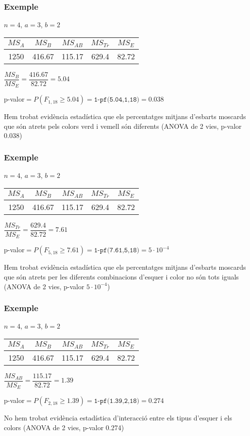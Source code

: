 \documentclass[12pt,t]{beamer}
\renewcommand{\geq}{\geqslant}
\theoremstyle{plain}
\theoremstyle{definition}
\begin{document}
\begin{frame}
\frametitle{Exemple}

$n=4$, $a=3$, $b=2$
\medskip

\begin{center}
\begin{tabular}{ccccc}
$MS_A$ & $MS_B$ & $MS_{AB}$ & $MS_{Tr}$ & $MS_E$\\ \hline
1250 &  416.67 &  115.17 & 629.4 &   82.72
\end{tabular}
\end{center}

$\dfrac{MS_{B}}{MS_E}=\dfrac{416.67}{82.72}=5.04$\medskip 

p-valor$=P(F_{1,18}\geq 5.04)=\texttt{1-pf(5.04,1,18)}=0.038$
\bigskip

Hem trobat evidència estadística que els percentatges mitjans d'esbarts moscards que són atrets pels  colors verd i vemell són diferents (ANOVA de 2 vies, p-valor 0.038)

\end{frame}

\begin{frame}\frametitle{Exemple}

$n=4$, $a=3$, $b=2$
\medskip

\begin{center}
\begin{tabular}{ccccc}
$MS_A$ & $MS_B$ & $MS_{AB}$ & $MS_{Tr}$ & $MS_E$\\ \hline
1250 &  416.67 &  115.17 & 629.4 &   82.72
\end{tabular}
\end{center}

$\dfrac{MS_{Tr}}{MS_E}=\dfrac{629.4}{82.72}=7.61$\medskip 

p-valor$=P(F_{5,18}\geq 7.61)=\texttt{1-pf(7.61,5,18)}=5\cdot 10^{-4}$
\bigskip

Hem trobat evidència estadística que els percentatges mitjans d'esbarts moscards que són atrets per les diferents combinacions d'esquer i color no són tots iguals (ANOVA de 2 vies, p-valor $5\cdot 10^{-4}$)

\end{frame}

\begin{frame}\frametitle{Exemple}

$n=4$, $a=3$, $b=2$
\medskip

\begin{center}
\begin{tabular}{ccccc}
$MS_A$ & $MS_B$ & $MS_{AB}$ & $MS_{Tr}$ & $MS_E$\\ \hline
1250 &  416.67 &  115.17 & 629.4 &   82.72
\end{tabular}
\end{center}

$\dfrac{MS_{AB}}{MS_E}=\dfrac{115.17}{82.72}=1.39$\medskip 

p-valor$=P(F_{2,18}\geq 1.39)=\texttt{1-pf(1.39,2,18)}=0.274$
\bigskip

No hem trobat evidència estadística d'interacció entre els tipus d'esquer i els colors (ANOVA de 2 vies, p-valor 0.274)

\end{frame}
\end{document}
